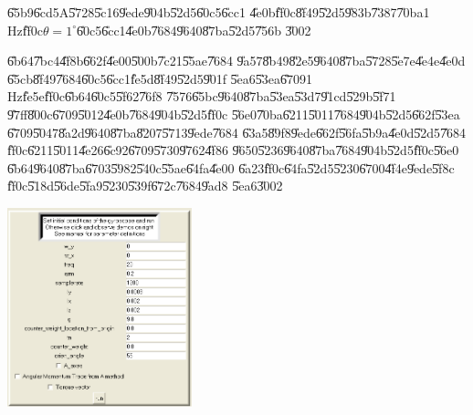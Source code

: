 \clearpage%

\begin{case}
\U{65b9}\U{6cd5}A\U{5728}\U{5c16}\U{9ede}\U{904b}\U{52d5}\U{60c5}\U{6cc1}%
\U{4e0b}\U{ff0c}\U{8f49}\U{52d5}\U{983b}\U{7387}\U{70ba}1 Hz\U{ff0c}$\theta
=1^{\circ }$\U{60c5}\U{6cc1}\U{4e0b}\U{7684}\U{9640}\U{87ba}\U{52d5}\U{756b}%
\U{3002}
\end{case}

\U{6b64}\U{7bc4}\U{4f8b}\U{662f}\U{4e00}\U{500b}\U{7c21}\U{55ae}\U{7684}%
\U{9a57}\U{8b49}\U{82e5}\U{9640}\U{87ba}\U{5728}\U{5e7e}\U{4e4e}\U{4e0d}%
\U{65cb}\U{8f49}\U{7684}\U{60c5}\U{6cc1}\U{fe5d}\U{8f49}\U{52d5}\U{901f}%
\U{5ea6}\U{53ea}\U{6709}1 Hz\U{fe5e}\U{ff0c}\U{6b64}\U{60c5}\U{5f62}\U{76f8}%
\U{7576}\U{65bc}\U{9640}\U{87ba}\U{53ea}\U{53d7}\U{91cd}\U{529b}\U{5f71}%
\U{97ff}\U{800c}\U{6709}\U{5012}\U{4e0b}\U{7684}\U{904b}\U{52d5}\U{ff0c}%
\U{56e0}\U{70ba}\U{6211}\U{5011}\U{7684}\U{904b}\U{52d5}\U{662f}\U{53ea}%
\U{6709}\U{5047}\U{8a2d}\U{9640}\U{87ba}\U{8207}\U{5713}\U{9ede}\U{7684}%
\U{63a5}\U{89f8}\U{9ede}\U{662f}\U{56fa}\U{5b9a}\U{4e0d}\U{52d5}\U{7684}%
\U{ff0c}\U{6211}\U{5011}\U{4e26}\U{6c92}\U{6709}\U{5730}\U{9762}\U{4f86}%
\U{9650}\U{5236}\U{9640}\U{87ba}\U{7684}\U{904b}\U{52d5}\U{ff0c}\U{56e0}%
\U{6b64}\U{9640}\U{87ba}\U{6703}\U{5982}\U{540c}\U{55ae}\U{64fa}\U{4e00}%
\U{6a23}\U{ff0c}\U{64fa}\U{52d5}\U{5230}\U{6700}\U{4f4e}\U{9ede}\U{5f8c}%
\U{ff0c}\U{518d}\U{56de}\U{5fa9}\U{5230}\U{539f}\U{672c}\U{7684}\U{9ad8}%
\U{5ea6}\U{3002}

\begin{center}
\includegraphics[width=0.4\textwidth]{./figs/parameter_1.png}
\end{center}%

